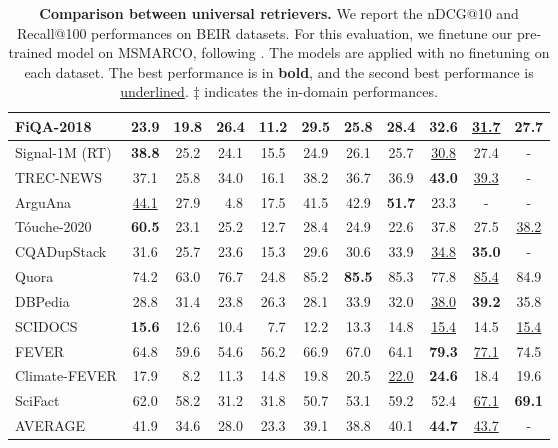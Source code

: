 \begin{table}[t]
{\begin{tabular}{@{}l  c  c  c c c c c  c c  c@{}}
   FiQA-2018     & 23.9 & 19.8 & 26.4 & 11.2 & 29.5 & 25.8 & 28.4 & \textbf{32.6} & \underline{31.7} & 27.7 \\ \midrule
   Signal-1M (RT)& \textbf{38.8} & 25.2 & 24.1 & 15.5 & 24.9 & 26.1 & 25.7 & \underline{30.8} & 27.4 & - \\ \midrule
   TREC-NEWS     & 37.1 & 25.8 & 34.0 & 16.1 & 38.2 & 36.7 & 36.9 & \textbf{43.0} & \underline{39.3} & - \\ \midrule
   ArguAna       & \underline{44.1} & 27.9 & ~4.8 & 17.5 & 41.5 & 42.9 & \textbf{51.7} & 23.3 & - & - \\
   T\'ouche-2020 & \textbf{60.5} & 23.1 & 25.2 & 12.7 & 28.4 & 24.9 & 22.6 & 37.8 & 27.5 & \underline{38.2}\\ \midrule
   CQADupStack   & 31.6 & 25.7 & 23.6 & 15.3 & 29.6 & 30.6 & 33.9 & \underline{34.8} & \textbf{35.0} & - \\
   Quora         & 74.2 & 63.0 & 76.7 & 24.8 & 85.2 & \textbf{85.5} & 85.3 & 77.8 & \underline{85.4} & 84.9 \\ \midrule
   DBPedia       & 28.8 & 31.4 & 23.8 & 26.3 & 28.1 & 33.9 & 32.0 & \underline{38.0} & \textbf{39.2} & \colorbox{green!30}{35.8} \\ \midrule
   SCIDOCS       & \textbf{15.6} & 12.6 & 10.4 & ~7.7 & 12.2 & 13.3 & 14.8 & \underline{15.4} & 14.5 & \underline{15.4} \\ \midrule
   FEVER         & 64.8 & 59.6 & 54.6 & 56.2 & 66.9 & 67.0 & 64.1 & \textbf{79.3} & \underline{77.1} & \colorbox{green!30}{74.5} \\
   Climate-FEVER & 17.9 & ~8.2 & 11.3 & 14.8 & 19.8 & 20.5 & \underline{22.0} & \textbf{24.6} & 18.4 & 19.6 \\
   SciFact       & 62.0 & 58.2 & 31.2 & 31.8 & 50.7 & 53.1 & 59.2 & 52.4 & \underline{67.1} &\textbf{69.1} \\ \midrule
   AVERAGE       & 41.9 & 34.6 & 28.0 & 23.3 & 39.1 & 38.8 & 40.1 & \textbf{44.7} & \underline{43.7} & - \\
        \bottomrule
    \end{tabular}}
    \caption{\textbf{Comparison between universal retrievers.} We report the nDCG@10 and Recall@100 performances on BEIR datasets. 
    For this evaluation, we finetune our pre-trained model on MSMARCO, following .
    The models are applied with no finetuning on each dataset.
    The best performance is in \textbf{bold}, and the second best performance is \underline{underlined}.
    $\ddagger$ indicates the in-domain performances.}
    \label{tab:results}
\end{table}


